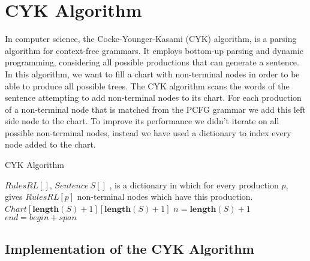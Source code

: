 \documentclass[a4paper,11pt]{article}
\begin{document}
\section{CYK Algorithm}
\label{cyk}
In computer science, the Cocke-Younger-Kasami (CYK) algorithm, is a parsing algorithm for context-free grammars. It employs bottom-up parsing and dynamic programming, considering all possible productions that can generate a sentence. In this algorithm, we want to fill a chart with non-terminal nodes in order to be able to produce all possible trees. The CYK algorithm scans the words of the sentence attempting to add non-terminal nodes to its chart. For each production of a non-terminal node that is matched from the PCFG grammar we add this left side node to the chart. To improve its performance we didn't iterate on all possible non-terminal nodes, instead we have used a dictionary to index every node added to the chart.

\begin{algorithm}[t!]
\caption{CYK Algorithm}
\label{CYK}
\begin{small}
\begin{algorithmic}[1]
$RulesRL[]$, $Sentence\ S[]$
, is a dictionary in which for every production $p$, gives $RulesRL[p]$ non-terminal nodes which have this production.
$Chart[\textbf{length}(S)+1][\textbf{length}(S)+1]$
\STATE
{}
\ELSE
{}
\ENDFOR
\ENDIF
{}
\ENDFOR
\STATE
{}
\STATE $n = \textbf{length}(S) + 1$
\STATE $end = begin + span$
\ENDFOR
\ENDFOR
\ENDFOR
\ENDFOR
{}
\ENDFOR
\ENDFOR
\end{algorithmic}
\end{small}
\end{algorithm}



\subsection{Implementation of the CYK Algorithm}
\end{document}
